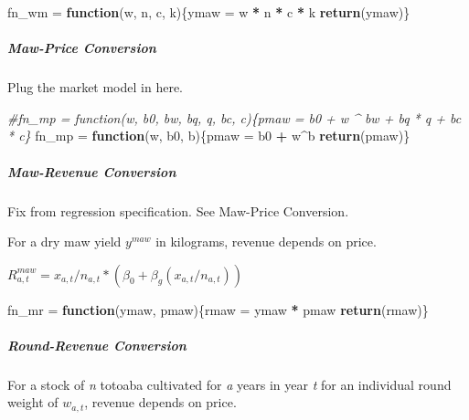 \documentclass[]{article}
\newenvironment{Shaded}{\begin{snugshade}}{\end{snugshade}}
\newcommand{\KeywordTok}[1]{\textcolor[rgb]{0.13,0.29,0.53}{\textbf{#1}}}
\newcommand{\StringTok}[1]{\textcolor[rgb]{0.31,0.60,0.02}{#1}}
\newcommand{\CommentTok}[1]{\textcolor[rgb]{0.56,0.35,0.01}{\textit{#1}}}
\newcommand{\ControlFlowTok}[1]{\textcolor[rgb]{0.13,0.29,0.53}{\textbf{#1}}}
\newcommand{\OperatorTok}[1]{\textcolor[rgb]{0.81,0.36,0.00}{\textbf{#1}}}
\newcommand{\NormalTok}[1]{#1}
\let\oldsubparagraph\subparagraph
\renewcommand{\subparagraph}[1]{\oldsubparagraph{#1}\mbox{}}
\begin{document}
\begin{Shaded}
\begin{Highlighting}[]
\NormalTok{fn_wm =}\StringTok{ }\ControlFlowTok{function}\NormalTok{(w, n, c, k)\{ymaw =}\StringTok{ }\NormalTok{w }\OperatorTok{*}\StringTok{ }\NormalTok{n }\OperatorTok{*}\StringTok{ }\NormalTok{c }\OperatorTok{*}\StringTok{ }\NormalTok{k}
                             \KeywordTok{return}\NormalTok{(ymaw)\}}
\end{Highlighting}
\end{Shaded}

\subparagraph{Maw-Price Conversion}\label{maw-price-conversion}

Plug the market model in here.

\begin{Shaded}
\begin{Highlighting}[]
\CommentTok{#fn_mp = function(w, b0, bw, bq, q, bc, c)\{pmaw = b0 + w ^ bw + bq * q + bc * c\}}
\NormalTok{fn_mp =}\StringTok{ }\ControlFlowTok{function}\NormalTok{(w, b0, b)\{pmaw =}\StringTok{ }\NormalTok{b0 }\OperatorTok{+}\StringTok{ }\NormalTok{w}\OperatorTok{^}\NormalTok{b}
                           \KeywordTok{return}\NormalTok{(pmaw)\}}
\end{Highlighting}
\end{Shaded}

\subparagraph{Maw-Revenue Conversion}\label{maw-revenue-conversion}

Fix from regression specification. See Maw-Price Conversion.

For a dry maw yield \(y^{maw}\) in kilograms, revenue depends on price.

\(R^{maw}_{a, t} = x_{a, t}/n_{a, t} * (\beta_0 + \beta_{g}(x_{a, t}/n_{a, t}))\)

\begin{Shaded}
\begin{Highlighting}[]
\NormalTok{fn_mr =}\StringTok{ }\ControlFlowTok{function}\NormalTok{(ymaw, pmaw)\{rmaw =}\StringTok{ }\NormalTok{ymaw }\OperatorTok{*}\StringTok{ }\NormalTok{pmaw}
                             \KeywordTok{return}\NormalTok{(rmaw)\}}
\end{Highlighting}
\end{Shaded}

\subparagraph{Round-Revenue Conversion}\label{round-revenue-conversion}

For a stock of \emph{n} totoaba cultivated for \emph{a} years in year
\emph{t} for an individual round weight of \(w_{a, t}\), revenue depends
on price.
\end{document}
